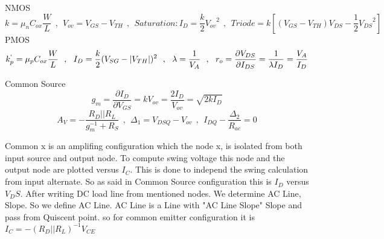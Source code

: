 NMOS
$$ k = {\mu}_n C_{ox} \frac{W}{L} ~~ , ~~ V_{ov} = V_{GS} - V_{TH} ~~, ~~  Saturation: I_D = \frac{k}{2} {V_{ov}}^2 ~~,~~ Triode = k [(V_{GS} - V_{TH})V_{DS} - \frac{1}{2}{V_{DS}}^2]$$
PMOS
$$ k^{`}_p = {\mu}_p C_{ox} \frac{W}{L} ~~, ~~ I_D = \frac{k}{2} (V_{SG} - |V_{TH}|)^2 ~~,~~ 
\lambda = \frac{1}{V_A} ~~, ~~ r_o = \frac{\partial V_{DS}}{\partial I_{DS}} = \frac{1}{\lambda  I_D} = \frac{V_A}{I_D}$$
\par Common Source
$$ g_m = \frac{\partial I_D}{\partial V_{GS}} = k V_{ov} = \frac{2 I_D}{V_{ov}} =  \sqrt{2 k I_D}  $$
$$ A_V = -\dfrac{R_D || R_L}{g_m^{-1} + R_S} ~~ , ~~  {\Delta}_1 = V_{DSQ} - V_{ov} ~~ , ~~ I_{DQ} - \frac{{\Delta}_2}{R_{ac}} = 0 $$
\setlength{\parindent}{0.5cm} %
\par
Common x is an amplifing configuration which the node x, is isolated from both input source and output node. To compute swing voltage this node and the output node are plotted versus $I_C$. This is done to independ the swing calculation from input alternate. So as said in Common Source configuration this is $I_D$ versus $V_DS$. After writing DC load line from mentioned nodes. We determine AC Line, Slope. So we define AC Line. AC Line is a Line with "AC Line Slope" Slope and pass from Quiscent point. so for common emitter configuration it is $ I_C = - ( R_D || R_L )^{-1} V_{CE} $
\setlength{\parindent}{0.0cm} 
